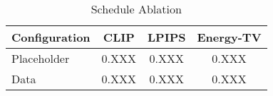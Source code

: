 
\begin{table}[H]
\centering
\caption{Schedule Ablation}
\label{tab:table4_schedule_ablation}
\begin{tabular}{lccc}
\toprule
Configuration & CLIP & LPIPS & Energy-TV \\
\midrule
Placeholder & 0.XXX & 0.XXX & 0.XXX \\
Data & 0.XXX & 0.XXX & 0.XXX \\
\bottomrule
\end{tabular}
\end{table}

